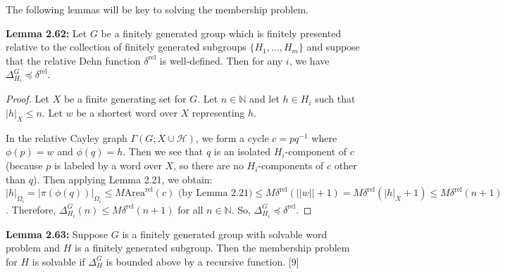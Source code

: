 \documentclass[12pt]{article}
\newcommand{\vs}{\vskip10pt}
\begin{document}
	\vs 
	
	The following lemmas will be key to solving the membership problem. 
	
	\vs 
	
	\textbf{Lemma 2.62: } Let $G$ be a finitely generated group which is finitely presented relative to the collection of finitely generated subgroups $\{H_1,...,H_m\}$ and suppose that the relative Dehn function $\delta^{\text{rel}}$ is well-defined.  Then for any $i$, we have $\Delta_{H_i}^G \preccurlyeq \delta^{\text{rel}}$. 
	
	\begin{proof}
		
		Let $X$ be a finite generating set for $G$. Let $n \in \mathbb{N}$ and let $h \in H_i$ such that $\vert h \vert_X \leq n$. Let $w$ be a shortest word over $X$ representing $h$. 
		
		\vs 
		
		In the relative Cayley graph $\Gamma(G; X \cup \mathcal{H})$, we form a cycle $c = pq^{-1}$ where $\phi(p) = w$ and $\phi(q) = h$. Then we see that $q$ is an isolated $H_i$-component of $c$ (because $p$ is labeled by a word over $X$, so there are no  $H_i$-components of $c$ other than $q$). Then applying Lemma 2.21, we obtain: $\vert h \vert_{\Omega_i} = \vert \pi(\phi(q)) \vert_{\Omega_i} \leq M \text{Area}^{\text{rel}}(c) \text{ (by Lemma 2.21)} \leq M \delta^{\text{rel}}( \vert \vert w \vert \vert + 1) = M \delta^{\text{rel}}( \vert h \vert_X + 1) \leq M \delta^{\text{rel}}(n + 1)$. Therefore, $\Delta_{H_i}^G (n) \leq M \delta^{\text{rel}}(n + 1)$ for all $n \in \mathbb{N}$. So,  $\Delta_{H_i}^G \preccurlyeq \delta^{\text{rel}}$.
		
	\end{proof}

	\vs 
	
	\textbf{Lemma 2.63: } Suppose $G$ is a finitely generated group with solvable word problem and $H$ is a finitely generated subgroup. Then the membership problem for $H$ is solvable if $\Delta_H^G$ is bounded above by a recursive function. [9]
	
\end{document}
